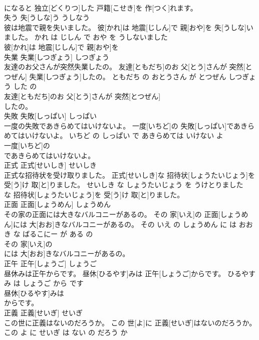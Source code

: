 \documentclass[8pt]{extreport}
\begin{document}
\begin{CJK}{UTF8}{min}
\\	になると 独立[どくりつ]した 戸籍[こせき]を 作[つく]れます。			
\\	失う	失[うしな]う	うしなう	
\\	彼は地震で親を失いました。	彼[かれ]は 地震[じしん]で 親[おや]を 失[うしな]いました。	かれ は じしん で おや を うしないました	
\\	彼[かれ]は 地震[じしん]で 親[おや]を
\\	失業	失業[しつぎょう]	しつぎょう	
\\	友達のお父さんが突然失業したの。	友達[ともだち]のお 父[とう]さんが 突然[とつぜん] 失業[しつぎょう]したの。	ともだち の おとうさん が とつぜん しつぎょう した の	
\\	友達[ともだち]のお 父[とう]さんが 突然[とつぜん]
\\	したの。			
\\	失敗	失敗[しっぱい]	しっぱい	
\\	一度の失敗であきらめてはいけないよ。	一度[いちど]の 失敗[しっぱい]であきらめてはいけないよ。	いちど の しっぱい で あきらめては いけない よ	
\\	一度[いちど]の
\\	であきらめてはいけないよ。			
\\	正式	正式[せいしき]	せいしき	
\\	正式な招待状を受け取りました。	正式[せいしき]な 招待状[しょうたいじょう]を 受[う]け 取[と]りました。	せいしき な しょうたいじょう を うけとりました	
\\	な 招待状[しょうたいじょう]を 受[う]け 取[と]りました。			
\\	正面	正面[しょうめん]	しょうめん	
\\	その家の正面には大きなバルコニーがあるの。	その 家[いえ]の 正面[しょうめん]には 大[おお]きなバルコニーがあるの。	その いえ の しょうめん に は おおき な ばるこにー が ある の	
\\	その 家[いえ]の
\\	には 大[おお]きなバルコニーがあるの。			
\\	正午	正午[しょうご]	しょうご	
\\	昼休みは正午からです。	昼休[ひるやす]みは 正午[しょうご]からです。	ひるやすみ は しょうご から です	
\\	昼休[ひるやす]みは
\\	からです。			
\\	正義	正義[せいぎ]	せいぎ	
\\	この世に正義はないのだろうか。	この 世[よ]に 正義[せいぎ]はないのだろうか。	この よ に せいぎ は ない の だろう か	

\end{CJK}
\end{document}
